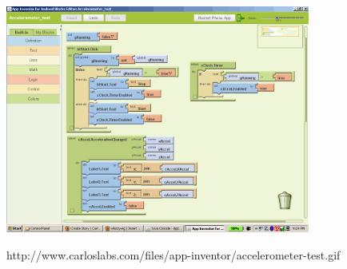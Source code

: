 
\begin{frame}
\frametitle{}

\begin{center}
  \includegraphics[width=10cm]{figs/appInventor.png}
\end{center}


\begin{flushright}
{\tiny
http://www.carloslabs.com/files/app-inventor/accelerometer-test.gif
}
\end{flushright}

\end{frame}


